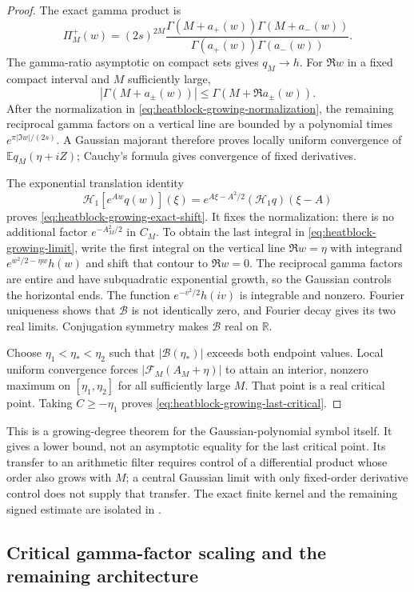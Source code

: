 \documentclass[11pt]{article}
\theoremstyle{definition}
\theoremstyle{remark}
\newcommand{\R}{\mathbb R}
\newcommand{\E}{\mathbb E}
\begin{document}
\begin{proof}
The exact gamma product is
\[
 \Pi_M^+(w)=(2s)^{2M}
 \frac{\Gamma(M+a_+(w))\Gamma(M+a_-(w))}
      {\Gamma(a_+(w))\Gamma(a_-(w))}.
\]
The gamma-ratio asymptotic on compact sets gives $q_M\to h$.
For $\Re w$ in a fixed compact interval and $M$ sufficiently large,
\[
 |\Gamma(M+a_\pm(w))|
 \le\Gamma(M+\Re a_\pm(w)).
\]
After the normalization in \eqref{eq:heatblock-growing-normalization},
the remaining reciprocal gamma factors on a vertical line are bounded
by a polynomial times $e^{\pi|\Im w|/(2s)}$.  A Gaussian majorant
therefore proves locally uniform convergence of
$\E q_M(\eta+iZ)$; Cauchy's formula gives convergence of fixed
derivatives.

The exponential translation identity
\[
 \mathcal H_1[e^{Aw}q(w)](\xi)
 =e^{A\xi-A^2/2}(\mathcal H_1q)(\xi-A)
\]
proves \eqref{eq:heatblock-growing-exact-shift}.  It fixes the
normalization: there is no additional factor $e^{-A_M^2/2}$ in $C_M$.
To obtain the last integral in \eqref{eq:heatblock-growing-limit},
write the first integral on the vertical line $\Re w=\eta$ with
integrand $e^{w^2/2-\eta w}h(w)$ and shift that contour to $\Re w=0$.
The reciprocal gamma factors are entire and have subquadratic
exponential growth, so the Gaussian controls the horizontal ends.
The function $e^{-v^2/2}h(iv)$ is integrable and nonzero.  Fourier
uniqueness shows that $\mathscr B$ is not identically zero, and
Fourier decay gives its two real limits.  Conjugation symmetry makes
$\mathscr B$ real on $\R$.

Choose $\eta_1<\eta_*<\eta_2$ such that
$|\mathscr B(\eta_*)|$ exceeds both endpoint values.  Local uniform
convergence forces $|\mathscr F_M(A_M+\eta)|$ to attain an interior,
nonzero maximum on $[\eta_1,\eta_2]$ for all sufficiently large $M$.
That point is a real critical point.  Taking $C\ge-\eta_1$ proves
\eqref{eq:heatblock-growing-last-critical}.
\end{proof}

This is a growing-degree theorem for the Gaussian-polynomial symbol
itself.  It gives a lower bound, not an asymptotic equality for the
last critical point.  Its transfer to an arithmetic filter requires
control of a differential product whose order also grows with $M$;
a central Gaussian limit with only fixed-order derivative control
does not supply that transfer.  The exact finite kernel and the
remaining signed estimate are isolated in
.


\subsection{Critical gamma-factor scaling and the remaining architecture}
\label{subsec:heatblock-gamma-boundary}
\end{document}
